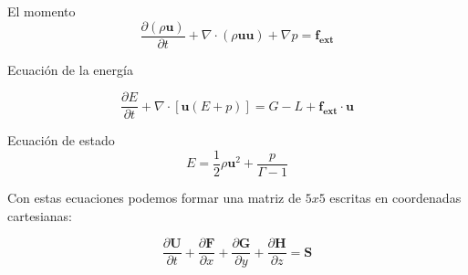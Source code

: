 \documentclass[12pt,a4paper]{book}
\begin{document}
El momento
\begin{equation}  \label{conservacion_momento_hidrodinamica}
\dfrac{\partial \left( \rho \mathbf{u} \right) }{\partial t}+ \nabla \cdot \left( \rho \mathbf{u u} \right) + \nabla p = \mathbf{f_{ext}}
\end{equation}

Ecuación de la energía

\begin{equation} \label{conservacion_energia_hidrodinamica}
\dfrac{\partial E }{\partial t} + \nabla \cdot \left[ \mathbf{u} \left( E+p \right) \right] =G-L+\mathbf{f_{ext} \cdot \mathbf{u}}
\end{equation}

Ecuación de estado
\begin{equation}
E=\frac{1}{2} \rho \mathbf{u}^{2} + \frac{p}{\Gamma - 1}
\end{equation}

Con estas ecuaciones podemos formar una matriz de $5x5$ escritas en coordenadas cartesianas:

\begin{equation} \label{euler_cartesianas}
\dfrac{\partial \mathbf{U}}{\partial t}+\dfrac{\partial \mathbf{F}}{\partial x}+\dfrac{\partial \mathbf{G}}{\partial y}+\dfrac{\partial \mathbf{H}}{\partial z}= \mathbf{S}
\end{equation}
\end{document}
